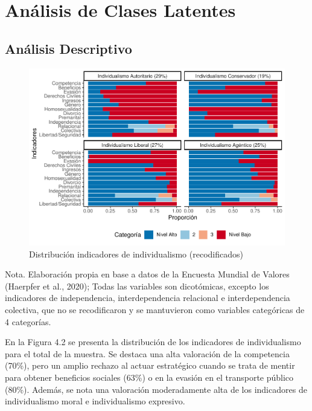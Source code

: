 \documentclass[12pt,twoside]{templates/facsothesis}
\begin{document}
\hypertarget{anuxe1lisis-de-clases-latentes-1}{%
\section{Análisis de Clases Latentes}\label{anuxe1lisis-de-clases-latentes-1}}

\hypertarget{anuxe1lisis-descriptivo-1}{%
\subsection*{Análisis Descriptivo}\label{anuxe1lisis-descriptivo-1}}

\begin{figure}[!ht]

{\centering \includegraphics[width=1\linewidth,]{tesis_files/figure-latex/unnamed-chunk-10-1} 

}

\caption{Distribución indicadores de individualismo (recodificados)}\label{fig:unnamed-chunk-10}
\end{figure}
\FloatBarrier

Nota. Elaboración propia en base a datos de la Encuesta Mundial de Valores (Haerpfer et al., 2020); Todas las variables son dicotómicas, excepto los indicadores de independencia, interdependencia relacional e interdependencia colectiva, que no se recodificaron y se mantuvieron como variables categóricas de 4 categorías.

En la Figura 4.2 se presenta la distribución de los indicadores de individualismo para el total de la muestra. Se destaca una alta valoración de la competencia (70\%), pero un amplio rechazo al actuar estratégico cuando se trata de mentir para obtener beneficios sociales (63\%) o en la evasión en el transporte público (80\%). Además, se nota una valoración moderadamente alta de los indicadores de individualismo moral e individualismo expresivo.
\end{document}
